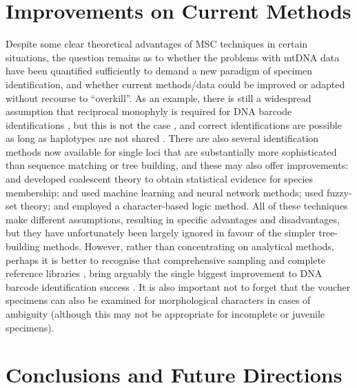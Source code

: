 \documentclass[12pt]{article}
\begin{document}
\section*{Improvements on Current Methods}

Despite some clear theoretical advantages of MSC techniques in certain situations, the question remains as to whether the problems with mtDNA data have been quantified sufficiently to demand a new paradigm of specimen identification, and whether current methods/data could be improved or adapted without recourse to ``overkill''. As an example, there is still a widespread assumption that reciprocal monophyly is required for DNA barcode identifications \citep{Goldstein2011}, but this is not the case \citep{Meier2008}, and correct identifications are possible as long as haplotypes are not shared \citep{Meier2006}. There are also several identification methods now available for single loci that are substantially more sophisticated than sequence matching or tree building, and these may also offer improvements: \citet{Nielsen2006} and \citet{Abdo2007} developed coalescent theory to obtain statistical evidence for species membership; \citet{Zhang2008} and \citet{Zhang2012a} used machine learning and neural network methods; \citet{Zhang2012b} used fuzzy-set theory; and \citet{Weitschek2013} employed a character-based logic method. All of these techniques make different assumptions, resulting in specific advantages and disadvantages, but they have unfortunately been largely ignored in favour of the simpler tree-building methods. However, rather than concentrating on analytical methods, perhaps it is better to recognise that comprehensive sampling and complete reference libraries \citep{Boykin2012,Virgilio2012}, bring arguably the single biggest improvement to DNA barcode identification success \citep{Ekrem2007}. It is also important not to forget that the  voucher specimens can also be examined for morphological characters in cases of ambiguity (although this may not be appropriate for incomplete or juvenile specimens).


\section*{Conclusions and Future Directions}
\end{document}
